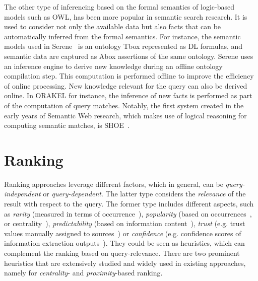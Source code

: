 	The other type of inferencing based on the formal semantics of logic-based models such as OWL, has been more popular in semantic search research. 
It is used 
to consider not only the available data but also facts that can be automatically inferred from the formal semantics. For instance, the semantic models used in Serene~\cite{DBLP:journals/ws/FazzingaGGL11} is an ontology Tbox represented as DL formulas, and semantic data are captured as Abox assertions of the same ontology. Serene uses an inference engine to derive new knowledge during an offline ontology compilation step. This computation is performed offline to improve the efficiency of online processing. 
New knowledge relevant for the query can also be derived online. 
In ORAKEL for instance, the inference of new facts is performed as part of the computation of query matches. Notably, the first system created in the early years of Semantic Web research, which makes use of logical reasoning for computing semantic matches, is SHOE~\cite{DBLP:conf/dagstuhl/HeflinHL03}. 
	
	
\section{Ranking}\label{sec:ranking}
Ranking approaches leverage different factors, which in general, can be \emph{query-independent} or \emph{query-dependent}. The latter type considers the \emph{relevance} of the result with respect to the query. The former type includes different aspects, such as \emph{rarity} (measured in terms of occurrence~\cite{DBLP:journals/internet/Aleman-MezaHARS05}), \emph{popularity} (based on occurrences~\cite{DBLP:conf/icde/TranWRC09}, or centrality~\cite{DBLP:journals/internet/Aleman-MezaHARS05}), \emph{predictability} (based on information content~\cite{DBLP:conf/www/AnyanwuMS05}), \emph{trust} (e.g. trust values manually assigned to sources~\cite{DBLP:journals/internet/Aleman-MezaHARS05}) or \emph{confidence} (e.g. confidence scores of information extraction outputs~\cite{DBLP:conf/www/NieZWM05,DBLP:conf/vldb/ChengYC07}). They could be seen as heuristics, which can complement the ranking based on query-relevance. There are two prominent heuristics that are extensively studied and widely used in existing approaches, namely for \emph{centrality}- and \emph{proximity}-based ranking. 

